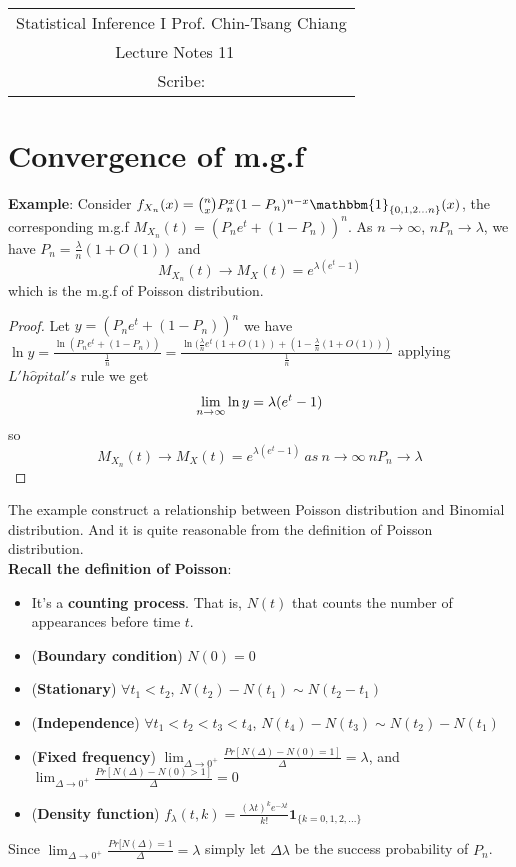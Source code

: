 \documentclass[../Transformation.tex]{subfiles}
\begin{document}
	\begin{center}
		\renewcommand{\arraystretch}{2}
		\begin{bfseries}
			\begin{tabular}{|c|}
				\hline
				Statistical Inference I \hfill Prof. Chin-Tsang Chiang\\
				\hspace{15em} {\large Lecture Notes 11} \hspace{15em}\ \\
				\lecdate \hfill Scribe: \scribe\\
				\hline
			\end{tabular}
			\renewcommand{\arraystretch}{1}
		\end{bfseries}
	\end{center}
	

\section{Convergence of m.g.f}
{\bf Example}: Consider $f_{X_n}(x)=\binom{n}{x}P_n^x(1-P_n)^{n-x}\mathbbm{1}_{\{0,1,2...n\}}(x)$, the corresponding m.g.f $M_{X_n}(t)=(P_ne^t+(1-P_n))^n$. As $n\rightarrow\infty$, $nP_n\rightarrow\lambda$, we have $P_n=\frac{\lambda}{n}(1+O(1))$ and $$M_{X_n}(t)\rightarrow M_X(t)=e^{\lambda(e^t-1)}$$ which is the m.g.f of Poisson distribution.
\begin{proof}
Let $y=(P_ne^t+(1-P_n))^n$ we have $\ln y=\frac{\ln(P_ne^t+(1-P_n))}{\frac{1}{n}}=\frac{\ln(\frac{\lambda}{n}e^t(1+O(1))+(1-\frac{\lambda}{n}(1+O(1)))}{\frac{1}{n}}$ applying $L'h\hat{o}pital's$ rule we get $$\lim_{n\rightarrow\infty}\ln y=\lambda(e^t-1)$$ so $$M_{X_n}(t)\rightarrow M_X(t)=e^{\lambda(e^t-1)}\ as \ n\rightarrow\infty\ nP_n\rightarrow\lambda$$
\end{proof}
\begin{intuition}
The example construct a relationship between Poisson distribution and Binomial distribution. And it is quite reasonable from the definition of Poisson distribution.\\
{\bf Recall the definition of Poisson}:
\begin{itemize}
	\item It's a {\bf counting process}. That is, $N(t)$ that counts the number of appearances before time $t$.
	\item ({\bf Boundary condition}) $N(0)=0$
	\item ({\bf Stationary}) $\forall t_1<t_2$, $N(t_2)-N(t_1)\sim N(t_2-t_1)$
	\item ({\bf Independence}) $\forall t_1<t_2<t_3<t_4$, $N(t_4)-N(t_3)\sim N(t_2)-N(t_1)$
	\item ({\bf Fixed frequency}) $\lim_{\Delta\rightarrow0^+} \frac{Pr[N(\Delta)-N(0) = 1]}{\Delta}=\lambda$, and $\lim_{\Delta\rightarrow0^+} \frac{Pr[N(\Delta)-N(0) > 1]}{\Delta}=0$
	\item ({\bf Density function}) $f_{\lambda}(t,k) = \frac{(\lambda t)^{k}e^{-\lambda t}}{k!}\mathbf{1}_{\{k=0,1,2,...\}}$
\end{itemize}
Since $\lim_{\Delta\rightarrow0^+} \frac{Pr[N(\Delta)=1}{\Delta}=\lambda$ simply let $\Delta\lambda$ be the success probability of $P_n$.
\end{intuition}
\end{document}
